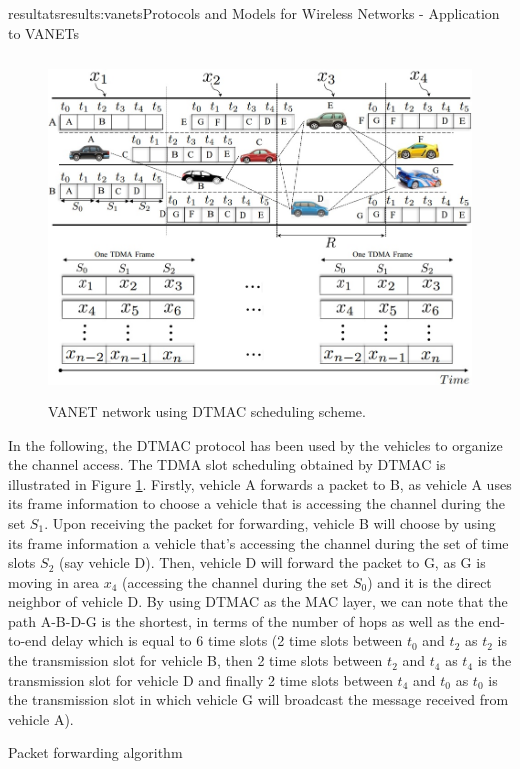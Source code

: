 \documentclass{ra2016}
\begin{document}
\begin{module}{resultats}{results:vanets}{Protocols and Models for Wireless Networks - Application to VANETs}
\begin{figure}[!htbp]
  \begin{center}
 \includegraphics[height=9cm,width=15cm]{IMG/TRPM.jpg}
  \caption{VANET network using DTMAC scheduling scheme.}
 \label{figc:trpm}
  \end{center}
\end{figure}

In the following, the DTMAC protocol has been used by the vehicles to organize the channel access. The TDMA slot 
scheduling obtained by DTMAC is illustrated in Figure \ref{figc:trpm}. Firstly, vehicle A forwards a packet to B, as  vehicle A uses its frame 
information to choose a vehicle that is accessing the channel during the set $S_1$. Upon receiving the packet for forwarding, vehicle B 
will choose by using its frame information a vehicle that's accessing the channel during the set of time slots $S_2$ 
(say vehicle D). Then, vehicle D will forward the packet to G, as G is moving in area $x_4$ (accessing the channel during the 
set $S_0$) and it is the direct neighbor of vehicle D. By using DTMAC as the MAC layer, we can note that the path A-B-D-G is 
the shortest, in terms of the number of hops as well as the end-to-end delay which  is equal to 6 time slots  (2 time slots 
between $t_0$ and $t_2$ as $t_2$ is the transmission slot for vehicle B, then 2 time slots between $t_2$ and $t_4$ as $t_4$ is the 
transmission slot for vehicle D and finally 2 time slots between $t_4$ and $t_0$ as $t_0$ is the transmission slot in which vehicle 
G will broadcast the message received from  vehicle A). 

Packet forwarding algorithm


\end{module}
\end{document}
